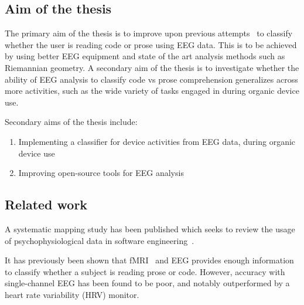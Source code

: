 


\subsection{Aim of the thesis}


    The primary aim of the thesis is to improve upon previous attempts~\cite{fucci_replication_2019} to classify whether the user is reading code or prose using EEG data. This is to be achieved by using better EEG equipment and state of the art analysis methods such as Riemannian geometry. A secondary aim of the thesis is to investigate whether the ability of EEG analysis to classify code vs prose comprehension generalizes across more activities, such as the wide variety of tasks engaged in during organic device use.

    Secondary aims of the thesis include:

    \begin{enumerate}
        \item Implementing a classifier for device activities from EEG data, during organic device use
        \item Improving open-source tools for EEG analysis
    \end{enumerate}


\subsection{Related work}

    A systematic mapping study has been published which seeks to review the usage of psychophysiological data in software engineering~\cite{vieira_usage_2021}.

    It has previously been shown that fMRI~\cite{floyd_decoding_2017} and EEG\cite{fucci_replication_2019} provides enough information to classify whether a subject is reading prose or code. However, accuracy with single-channel EEG has been found to be poor, and notably outperformed by a heart rate variability (HRV) monitor.

